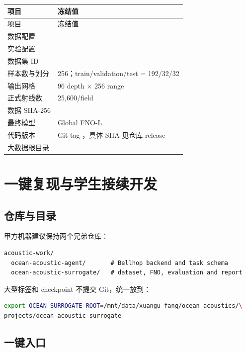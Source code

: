 \documentclass[UTF8,11pt]{ctexart}
\newcommand{\BestModel}{Global FNO-L}
\begin{document}
\begin{longtable}{L{4.4cm}L{9.6cm}}
\toprule
项目 & 冻结值 \\
\midrule
\endfirsthead
\toprule
项目 & 冻结值 \\
\midrule
\endhead
数据配置 &  \\
实验配置 &  \\
数据集 ID &  \\
样本数与划分 & 256；train/validation/test = 192/32/32 \\
输出网格 & 96 depth $\times$ 256 range \\
正式射线数 & 25,600/field \\
数据 SHA-256 &  \\
最终模型 & \BestModel \\
代码版本 & Git tag ，具体 SHA 见仓库 release \\
大数据根目录 &  \\
\bottomrule
\end{longtable}

\section{一键复现与学生接续开发}

\subsection{仓库与目录}

甲方机器建议保持两个兄弟仓库：
\begin{lstlisting}[style=repro]
acoustic-work/
  ocean-acoustic-agent/       # Bellhop backend and task schema
  ocean-acoustic-surrogate/   # dataset, FNO, evaluation and report
\end{lstlisting}

大型标签和 checkpoint 不提交 Git，统一放到：
\begin{lstlisting}[style=repro,language=bash]
export OCEAN_SURROGATE_ROOT=/mnt/data/xuangu-fang/ocean-acoustics/\
projects/ocean-acoustic-surrogate
\end{lstlisting}

\subsection{一键入口}
\end{document}
